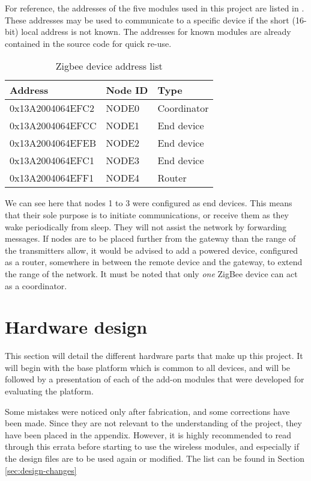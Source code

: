 For reference, the addresses of the five modules used in this project are listed
in . These addresses may be used to communicate to a specific
device if the short (16-bit) local address is not known. The addresses for known
modules are already contained in the source code for quick re-use.

\begin{table}[h]
  \centering
  \begin{tabular}{l|l|l}
    Address & Node ID & Type \\
    \hline
    0x13A2004064EFC2 & NODE0 & Coordinator \\
    0x13A2004064EFCC & NODE1 & End device \\
    0x13A2004064EFEB & NODE2 & End device \\
    0x13A2004064EFC1 & NODE3 & End device \\
    0x13A2004064EFF1 & NODE4 & Router \\
  \end{tabular}
  \caption{Zigbee device address list}
  \label{tab:addresses}
\end{table}

We can see here that nodes 1 to 3 were configured as end devices. This means
that their sole purpose is to initiate communications, or receive them as they
wake periodically from sleep. They will not assist the network by forwarding
messages. If nodes are to be placed further from the gateway than the range of
the transmitters allow, it would be advised to add a powered device, configured
as a router, somewhere in between the remote device and the gateway, to extend
the range of the network. It must be noted that only \emph{one} ZigBee device
can act as a coordinator. 

\pagebreak
\section{Hardware design}

This section will detail the different hardware parts that make up this project. 
It will begin with the base platform which is common to all devices, and will be
followed by a presentation of each of the add-on modules that were developed for
evaluating the platform.

Some mistakes were noticed only after fabrication, and some corrections have
been made. Since they are not relevant to the understanding of the project, they
have been placed in the appendix. However, it is highly recommended to read
through this errata before starting to use the wireless modules, and especially
if the design files are to be used again or modified. The list can be found in
Section \ref{sec:design-changes}

